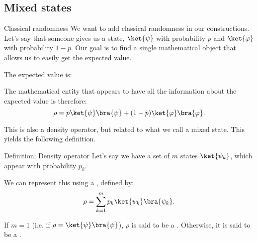 \documentclass[a4paper]{article}
\begin{document}
\subsection{Mixed states}

\begin{parag}{Classical randomness}
    We want to add classical randomness in our constructions. Let's say that someone gives us a state, $\ket{\psi}$ with probability $p$ and $\ket{\phi}$ with probability $1-p$. Our goal is to find a single mathematical object that allows us to easily get the expected value.

    The expected value is: 

    The mathematical entity that appears to have all the information about the expected value is therefore: 
    \[\rho = p \ket{\psi}\bra{\psi} + \left(1-p\right) \ket{\phi}\bra{\phi}.\]

    This is also a density operator, but related to what we call a mixed state. This yields the following definition.
\end{parag}

\begin{parag}{Definition: Density operator}
    Let's say we have a set of $m$ states $\ket{\psi_k}$, which appear with probability $p_k$.

    We can represent this using a , defined by: 
    \[\rho = \sum_{k = 1}^m p_k \ket{\psi_k}\bra{\psi_k}.\]

    If $m = 1$ (i.e. if $\rho = \ket{\psi} \bra{\psi}$), $\rho$ is said to be a . Otherwise, it is said to be a .
\end{parag}
\end{document}
